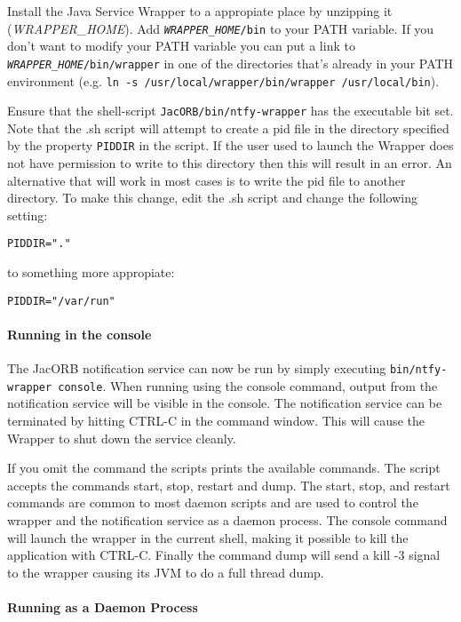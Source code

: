 Install the Java Service Wrapper to a appropiate place by unzipping it
(\emph{WRAPPER\_HOME}). Add
\texttt{\emph{WRAPPER\_HOME}/bin} to your PATH variable. If you don't
want to modify your PATH variable you can put a link to
\texttt{\emph{WRAPPER\_HOME}/bin/wrapper} in one of the directories
that's already in your PATH environment (e.g. \texttt{ln -s
  /usr/local/wrapper/bin/wrapper /usr/local/bin}).

Ensure that the shell-script
\texttt{JacORB/bin/ntfy-wrapper} has the executable bit set. Note that
the .sh script will attempt to create a pid file in the directory
specified by the property \texttt{PIDDIR} in the script. If
the user used to launch the Wrapper does not have permission to write
to this directory then this will result in an error. An alternative
that will work in most cases is to write the pid file to another
directory. To make this change, edit the .sh script and change the following setting:

\begin{verbatim}
PIDDIR="."
\end{verbatim}
to something more appropiate:
\begin{verbatim}
PIDDIR="/var/run"
\end{verbatim}

\paragraph{Running in the console}
\label{sec:running-console}

 The JacORB notification service  can now be run by simply executing
 \texttt{bin/ntfy-wrapper console}.
When running using the console command, output from the notification
 service will be visible in the console.
 The notification service can be terminated by hitting CTRL-C in the command
 window. This will cause the Wrapper to shut down the service cleanly.

 If you omit the command the scripts prints the available commands.
 The script accepts the commands start, stop, restart and dump. The
 start, stop, and restart commands are common to most daemon scripts
 and are used to control the wrapper and the notification service  as
 a daemon process. The console
 command will launch the wrapper in the current shell, making it
 possible to kill the application with CTRL-C. Finally the command
 dump will send a kill -3 signal to the wrapper causing its JVM
 to do a full thread dump.

 \paragraph{Running as a Daemon Process}
 \label{sec:running-as-daemon}

